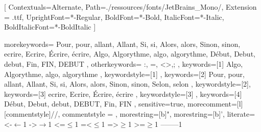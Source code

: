 
\setmonofont{JetBrainsMono}[
  Contextuals={Alternate},
  Path=./ressources/fonts/JetBrains_Mono/,
  Extension = .ttf,
  UprightFont=*-Regular,
  BoldFont=*-Bold,
  ItalicFont=*-Italic,
  BoldItalicFont=*-BoldItalic
]

{
	morekeywords={
    Pour, pour, allant, Allant, Si, si, Alors, alors, Sinon, sinon,
    ecrire, Ecrire, Écrire, écrire, Algo, Algorythme, algo, 
    algorythme, Début, Debut, debut, Fin, FIN, DEBUT
	},
	otherkeywords={
		:, =, <>,;
	},
  keywords=[1]{
    Algo, Algorythme, algo, algorythme
  },
  keywordstyle=[1]{
    \bfseries\color{red!75}
  },
	keywords=[2]{
    Pour, pour, allant, Allant, Si, si, Alors, alors, Sinon, sinon, 
    Selon, selon 
	},
	keywordstyle=[2]\color{blue!75},
 keywords=[3]{
  ecrire, Ecrire, Écrire, écrire
 },
 keywordstyle=[3]{
  \color{green!50!black}
 },
 keywords=[4]{
  Début, Debut, debut, DEBUT, Fin, FIN
 },
	sensitive=true,
	morecomment=[l][commentstyle]{//}, 
  commentstyle = \color{gray},
	morestring=[b]{"},
	morestring=[b]{'},
  literate=
      {<-}{$\leftarrow$}{1}%
      {->}{$\rightarrow$}{1}%
      {<=}{$\leq$}{1}%
      {=<}{$\leq$}{1}%
      {=>}{$\geq$}{1}%
      {>=}{$\geq$}{1}%
      {--}{{{\color{red}——}}}{1}}




\newcommand{\algorythme}[1]{
        
    }